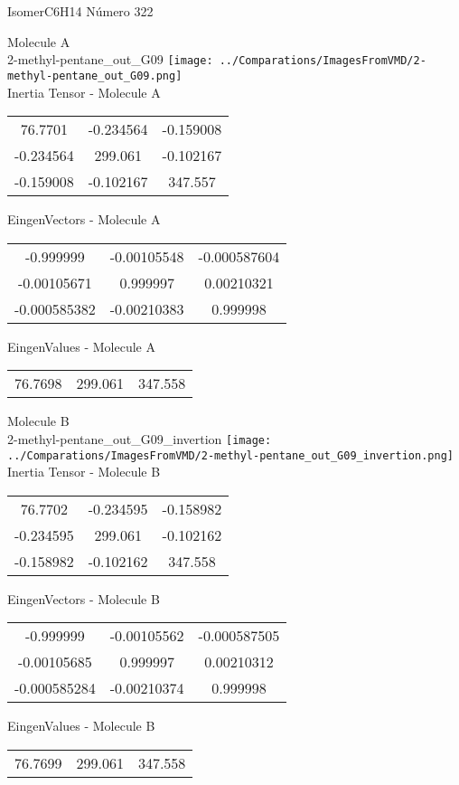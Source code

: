 \vtab[-2cm]
\begin{center}
{\large IsomerC6H14 \tab Número 322}
\end{center}
\begin{multicols}{2}
\begin{center}

Molecule A \\ 
2-methyl-pentane\_out\_G09
\texttt{[image: ../Comparations/ImagesFromVMD/2-methyl-pentane\_out\_G09.png]}
\\
Inertia Tensor - Molecule A \\
\vtab

\begin{tabular}{|c c c|}
76.7701	 & 	-0.234564	 & 	-0.159008	 \\
-0.234564	 & 	299.061	 & 	-0.102167	 \\
-0.159008	 & 	-0.102167	 & 	347.557
\end{tabular}

\vtab
 EingenVectors - Molecule A     \\
\vtab
\begin{tabular}{|c c c|}
-0.999999	 & 	-0.00105548	 & 	-0.000587604	 \\
-0.00105671	 & 	0.999997	 & 	0.00210321	 \\
-0.000585382	 & 	-0.00210383	 & 	0.999998
\end{tabular}

\vtab
 EingenValues - Molecule A     \\
\vtab
\begin{tabular}{|c c c|}
76.7698	 & 	299.061	 & 	347.558	 \\
\end{tabular}
\columnbreak

Molecule B \\ 
2-methyl-pentane\_out\_G09\_invertion
\texttt{[image: ../Comparations/ImagesFromVMD/2-methyl-pentane\_out\_G09\_invertion.png]}
\\
Inertia Tensor - Molecule B \\
\vtab

\begin{tabular}{|c c c|}
76.7702	 & 	-0.234595	 & 	-0.158982	 \\
-0.234595	 & 	299.061	 & 	-0.102162	 \\
-0.158982	 & 	-0.102162	 & 	347.558
\end{tabular}

\vtab
 EingenVectors - Molecule B     \\
\vtab
\begin{tabular}{|c c c|}
-0.999999	 & 	-0.00105562	 & 	-0.000587505	 \\
-0.00105685	 & 	0.999997	 & 	0.00210312	 \\
-0.000585284	 & 	-0.00210374	 & 	0.999998
\end{tabular}

\vtab
 EingenValues - Molecule B     \\
\vtab
\begin{tabular}{|c c c|}
76.7699	 & 	299.061	 & 	347.558	 \\
\end{tabular}

\end{center}
\end{multicols}

